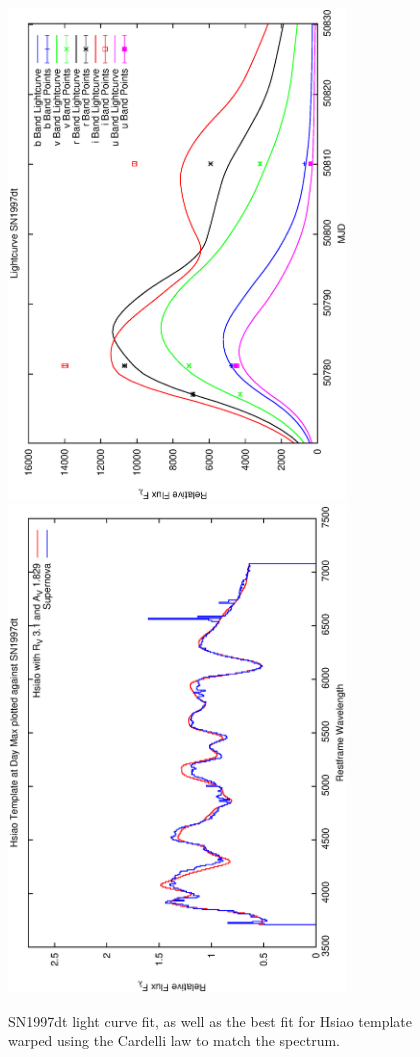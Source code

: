 \clearpage

\begin{figure}[p]
\centering
\includegraphics[angle=-90,width=0.8\textwidth]{./figures/ltcv/SN1997dt_v027_lightcurve.ps}
\hfill
\includegraphics[angle=-90,width=0.8\textwidth]{./figures/hsiao/SN1997dt_v001_hsiao.ps}
\hfill
\caption{SN1997dt light curve fit, as well as the best fit for Hsiao template warped using the Cardelli law to match the spectrum.}
\label{fig:SN1997dtfour2}
\end{figure}

